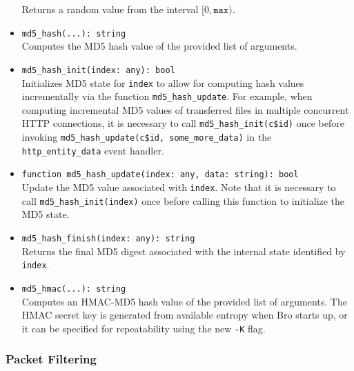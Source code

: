 \documentclass[10pt,landscape]{article}
\begin{document}
\begin{multicols*}{2}
\begin{itemize}
    Returns a random value from the interval $[0, \mathtt{max})$.
  \item \verb|md5_hash(...): string|\\
    Computes the MD5 hash value of the provided list of arguments.
  \item \verb|md5_hash_init(index: any): bool|\\
    Initializes MD5 state for \texttt{index} to allow for computing hash values
    incrementally via the function \verb|md5_hash_update|. For example, when
    computing incremental MD5 values of transferred files in multiple
    concurrent HTTP connections, it is necessary to call
    \verb|md5_hash_init(c$id)| once before invoking
    \verb|md5_hash_update(c$id, some_more_data)| in the \verb|http_entity_data|
    event handler.
  \item \verb|function md5_hash_update(index: any, data: string): bool|\\
    Update the MD5 value associated with \texttt{index}. Note that it is
    necessary to call \verb|md5_hash_init(index)| once before calling this
    function to initialize the MD5 state.
  \item \verb|md5_hash_finish(index: any): string|\\
    Returns the final MD5 digest associated with the internal state identified
    by \texttt{index}.
  \item \verb|md5_hmac(...): string|\\
    Computes an HMAC-MD5 hash value of the provided list of arguments. The HMAC
    secret key is generated from available entropy when Bro starts up, or it
    can be specified for repeatability using the new \texttt{-K} flag.
\end{itemize}

\subsubsection*{Packet Filtering}


\end{multicols*}
\end{document}
